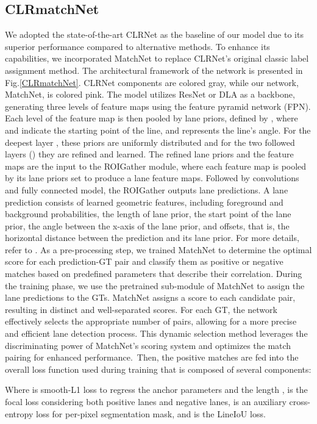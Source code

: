 \documentclass[10pt,twocolumn,letterpaper]{article}
\begin{document}
\subsection{\textbf{CLRmatchNet}}
We adopted the state-of-the-art CLRNet as the baseline of our model due to its superior performance compared to alternative methods. To enhance its capabilities, we incorporated MatchNet to replace CLRNet's original classic label assignment method. The architectural framework of the network is presented in Fig.\ref{CLRmatchNet}. CLRNet components are colored gray, while our network, MatchNet, is colored pink. The model utilizes ResNet\cite{resnet} or DLA\cite{DLA} as a backbone, generating three levels of feature maps using the feature pyramid network (FPN\cite{FPN}). Each level of the feature map is then pooled by  lane priors, defined by , where  and  indicate the starting point of the line, and  represents the line's angle. For the deepest layer , these priors are uniformly distributed and for the two followed layers () they are refined and learned. The refined lane priors and the feature maps are the input to the ROIGather module, where each feature map is pooled by its lane priors set to produce a lane feature maps. Followed by convolutions and fully connected model, the ROIGather outputs  lane predictions. A lane prediction consists of learned geometric features, including foreground and background probabilities, the length of lane prior, the start point of the lane prior, the angle between the x-axis of the lane prior, and  offsets, that is, the horizontal distance between the prediction and its lane prior. For more details, refer to \cite{CLRNet}. As a pre-processing step, we trained MatchNet to determine the optimal score for each prediction-GT pair  and classify them as positive or negative matches based on predefined parameters that describe their correlation. During the training phase, we use the pretrained sub-module of MatchNet to assign the  lane predictions to the GTs. MatchNet assigns a score to each candidate pair, resulting in distinct and well-separated scores. For each GT, the network effectively selects the appropriate number of pairs, allowing for a more precise and efficient lane detection process. This dynamic selection method leverages the discriminating power of MatchNet's scoring system and optimizes the match pairing for enhanced performance. Then, the positive matches are fed into the overall loss function used during training that is composed of several components:

Where  is smooth-L1 loss to regress the anchor parameters  and the length ,  is the focal loss \cite{CULane_F1} considering both positive lanes and negative lanes,  is an auxiliary cross-entropy loss for per-pixel segmentation mask, and  is the LineIoU loss. 
\end{document}
